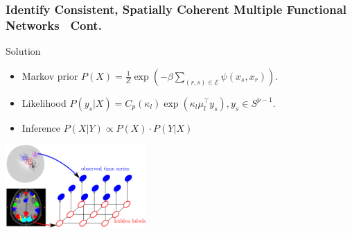 \documentclass[serif]{beamer}
\begin{document}
\begin{frame}
\frametitle{Identify Consistent, Spatially Coherent Multiple Functional Networks~\cite{liu2011monteCopy} Cont.}

      \begin{block}{Solution}
        \begin{itemize}
        \item Markov prior $P(X) = \frac{1}{Z} \exp \left ( -\beta \sum_{(r,s)\in \mathcal{E}} \psi(x_s, x_r)\right )$.
        \item Likelihood $P(y_s | X) = C_p(\kappa_l) \exp (\kappa_l \mu_l^{\top} y_s), y_s \in S^{p-1}$.
        \item Inference $P(X | Y) \propto P(X) \cdot P(Y|X) $
        \end{itemize}
      \end{block}

      \includegraphics[width=0.4\textwidth]{sfig/gen}

\end{frame}
\end{document}
